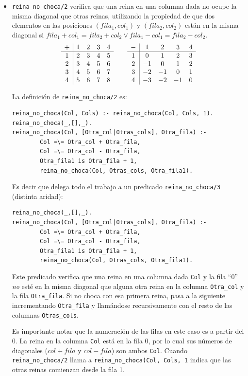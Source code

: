 \documentclass[12pt,titlepage]{article}
\begin{document}
\begin{itemize}
\item \lstinline$reina_no_choca/2$ verifica que una reina en una columna dada no ocupe la misma diagonal que otras reinas, utilizando la propiedad de que dos elementos en las posiciones $(fila_1, col_1)$ y $(fila_2, col_2)$ están en la misma diagonal si $fila_1 + col_1 = fila_2 + col_2 \lor fila_1 - col_1 = fila_2 - col_2$.
\[
\begin{array}{c|c c c c}
  + & 1 & 2 & 3 & 4 \\
  \hline
  1 & 2 & 3 & 4 & 5 \\
  2 & 3 & 4 & 5 & 6 \\
  3 & 4 & 5 & 6 & 7 \\
  4 & 5 & 6 & 7 & 8 \\
\end{array} \qquad \begin{array}{c|c c c c}
  - & 1 & 2 & 3 & 4 \\
  \hline
  1 & 0  & 1  & 2  & 3 \\
  2 & -1 & 0  & 1  & 2 \\
  3 & -2 & -1 & 0  & 1 \\
  4 & -3 & -2 & -1 & 0 \\
\end{array}
\]

La definición de \lstinline$reina_no_choca/2$ es:
\begin{lstlisting}
reina_no_choca(Col, Cols) :- reina_no_choca(Col, Cols, 1).
reina_no_choca(_,[],_).
reina_no_choca(Col, [Otra_col|Otras_cols], Otra_fila) :-
        Col =\= Otra_col + Otra_fila, 
        Col =\= Otra_col - Otra_fila,
        Otra_fila1 is Otra_fila + 1,
        reina_no_choca(Col, Otras_cols, Otra_fila1).
\end{lstlisting}

Es decir que delega todo el trabajo a un predicado \lstinline$reina_no_choca/3$ (distinta aridad):
\begin{lstlisting}
reina_no_choca(_,[],_).
reina_no_choca(Col, [Otra_col|Otras_cols], Otra_fila) :-
        Col =\= Otra_col + Otra_fila, 
        Col =\= Otra_col - Otra_fila,
        Otra_fila1 is Otra_fila + 1,
        reina_no_choca(Col, Otras_cols, Otra_fila1).
\end{lstlisting}
Este predicado verifica que una reina en una columna dada \lstinline$Col$ y la fila ``0'' \emph{no} esté en la misma diagonal que alguna otra reina en la columna \lstinline$Otra_col$ y la fila \lstinline$Otra_fila$. Si no choca con esa primera reina, pasa a la siguiente incrementando \lstinline$Otra_fila$ y llamándose recursivamente con el resto de las columnas \lstinline$Otras_cols$.

Es importante notar que la numeración de las filas en este caso es a partir del 0. La reina en la columna \lstinline$Col$ está en la fila 0, por lo cual sus números de diagonales ($col + fila$ y $col - fila$) son ambos \lstinline$Col$. Cuando \lstinline|reina_no_choca/2| llama a \lstinline|reina_no_choca(Col, Cols, 1| indica que las otras reinas comienzan desde la fila 1.

\end{itemize}
\end{document}
